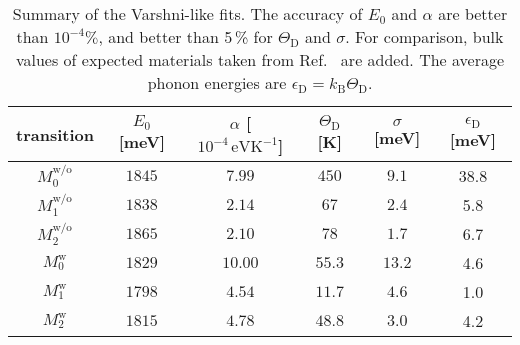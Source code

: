 \begin{table}
	\centering
	\caption{Summary of the Varshni-like fits. The accuracy of $E_0$ and $\alpha$ are better than $10^{-4}\%$, and better than 5$\,$\% for $\Theta_\mathrm{D}$ and $\sigma$. For comparison, bulk values of expected materials taken from Ref.~\cite{Vurgaftman} are added. The average phonon energies are $\epsilon_\mathrm{D}=k_\mathrm{B}\Theta_\mathrm{D}$.}
	\begin{tabularx}{1\textwidth}{cccccc}
		\toprule
		
		transition & $E_0$ [meV]& $\alpha$ [$10^{-4}\,\mathrm{eVK^{-1}}$]& $\Theta_\mathrm{D}$ [K]& $\sigma$ [meV]&  $\epsilon_\mathrm{D}$ [meV]\\ 	
		\midrule
		\midrule
		$M_0^\mathrm{w/o}$& $1845$ & $7.99$& $450$&$9.1$& 38.8\\
		$M_1^\mathrm{w/o}$& $1838$ & $2.14$& $67$&$2.4$&5.8\\
		$M_2^\mathrm{w/o}$ & $1865$ & $2.10$& $78$& $1.7$&6.7\\ 
		
		
		
		\midrule
		$M_0^\mathrm{w}$& $1829$ & $10.00$& $55.3$& $13.2$&4.6\\
		$M_1^\mathrm{w}$& $1798$ & $4.54$& $11.7$&$4.6$&1.0\\
		$M_2^\mathrm{w}$ & $1815$& $4.78$& $48.8$& $3.0$&4.2\\ 
		
		
		
		
		\midrule
		

\end{tabularx}
\end{table}
